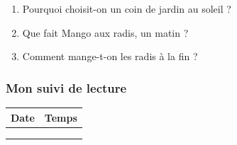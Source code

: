 \documentclass[
  french,
  french,
  14pt,
  a4paper]{extarticle}
\providecommand{\tightlist}{%
  \setlength{\itemsep}{0pt}\setlength{\parskip}{0pt}}
\begin{document}
{\begin{enumerate}
\def\labelenumi{\arabic{enumi}.}
\tightlist
\item
  Pourquoi choisit-on un coin de jardin au soleil ?
\item
  Que fait Mango aux radis, un matin ?
\item
  Comment mange-t-on les radis à la fin ?
\end{enumerate}

\subsubsection{Mon suivi de lecture}\label{mon-suivi-de-lecture-6}

\begin{center}
\begin{tabularx}{\textwidth}{|X|X|}
\hline
\textbf{Date} & \textbf{Temps} \\
\hline
& \\
\hline
& \\
\hline
& \\
\hline
\end{tabularx}
\end{center}

}%
\newpage
\end{document}
